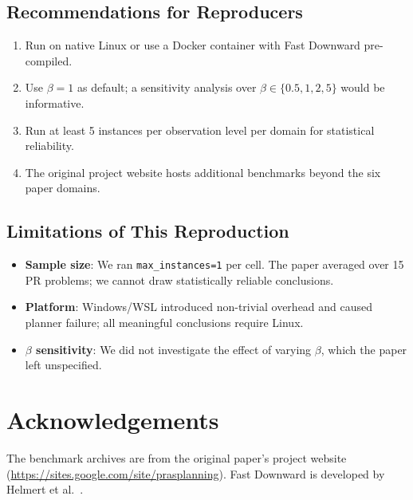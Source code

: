 \documentclass[10pt,twocolumn]{article}
\begin{document}
\subsection{Recommendations for Reproducers}

\begin{enumerate}
  \item Run on native Linux or use a Docker container with Fast Downward pre-compiled.
  \item Use $\beta = 1$ as default; a sensitivity analysis over $\beta \in \{0.5, 1, 2, 5\}$ would be informative.
  \item Run at least 5 instances per observation level per domain for statistical reliability.
  \item The original project website hosts additional benchmarks beyond the six paper domains.
\end{enumerate}

\subsection{Limitations of This Reproduction}

\begin{itemize}
  \item \textbf{Sample size}: We ran \texttt{max\_instances=1} per cell. The paper averaged over 15 PR problems; we cannot draw statistically reliable conclusions.
  \item \textbf{Platform}: Windows/WSL introduced non-trivial overhead and caused planner failure; all meaningful conclusions require Linux.
  \item \textbf{$\beta$ sensitivity}: We did not investigate the effect of varying $\beta$, which the paper left unspecified.
\end{itemize}

\section*{Acknowledgements}

The benchmark archives are from the original paper's project website (\url{https://sites.google.com/site/prasplanning}). Fast Downward is developed by Helmert et al.~\cite{helmert2006fast}.
\end{document}
